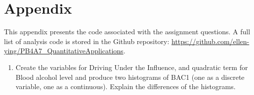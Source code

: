 \documentclass[
  11pt,
]{article}
\providecommand{\tightlist}{%
  \setlength{\itemsep}{0pt}\setlength{\parskip}{0pt}}
\begin{document}
\newpage

\hypertarget{appendix}{%
\section*{Appendix}\label{appendix}}

This appendix presents the code associated with the assignment
questions. A full list of analysis code is stored in the Github
repository:
\url{https://github.com/ellen-ying/PB4A7_QuantitativeApplications}.

\begin{enumerate}
\def\labelenumi{\arabic{enumi}.}
\tightlist
\item
  Create the variables for Driving Under the Influence, and quadratic
  term for Blood alcohol level and produce two histograms of BAC1 (one
  as a discrete variable, one as a continuous). Explain the differences
  of the histograms.
\end{enumerate}
\end{document}
